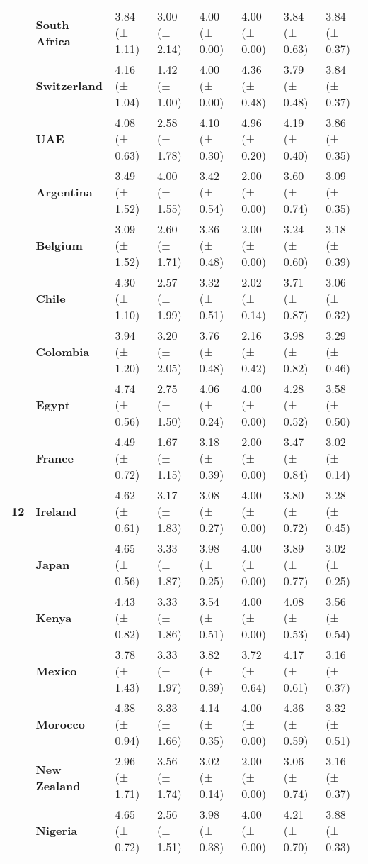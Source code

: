 \begin{tabular}{llllllll}
\textbf{} & \textbf{South Africa} & 3.84 (± 1.11) & 3.00 (± 2.14) & 4.00 (± 0.00) & 4.00 (± 0.00) & 3.84 (± 0.63) & 3.84 (± 0.37) \\
\textbf{} & \textbf{Switzerland} & 4.16 (± 1.04) & 1.42 (± 1.00) & 4.00 (± 0.00) & 4.36 (± 0.48) & 3.79 (± 0.48) & 3.84 (± 0.37) \\
\textbf{} & \textbf{UAE} & 4.08 (± 0.63) & 2.58 (± 1.78) & 4.10 (± 0.30) & 4.96 (± 0.20) & 4.19 (± 0.40) & 3.86 (± 0.35) \\
\cline{1-8}
\multirow[t]{19}{*}{\textbf{12}} & \textbf{Argentina} & 3.49 (± 1.52) & 4.00 (± 1.55) & 3.42 (± 0.54) & 2.00 (± 0.00) & 3.60 (± 0.74) & 3.09 (± 0.35) \\
\textbf{} & \textbf{Belgium} & 3.09 (± 1.52) & 2.60 (± 1.71) & 3.36 (± 0.48) & 2.00 (± 0.00) & 3.24 (± 0.60) & 3.18 (± 0.39) \\
\textbf{} & \textbf{Chile} & 4.30 (± 1.10) & 2.57 (± 1.99) & 3.32 (± 0.51) & 2.02 (± 0.14) & 3.71 (± 0.87) & 3.06 (± 0.32) \\
\textbf{} & \textbf{Colombia} & 3.94 (± 1.20) & 3.20 (± 2.05) & 3.76 (± 0.48) & 2.16 (± 0.42) & 3.98 (± 0.82) & 3.29 (± 0.46) \\
\textbf{} & \textbf{Egypt} & 4.74 (± 0.56) & 2.75 (± 1.50) & 4.06 (± 0.24) & 4.00 (± 0.00) & 4.28 (± 0.52) & 3.58 (± 0.50) \\
\textbf{} & \textbf{France} & 4.49 (± 0.72) & 1.67 (± 1.15) & 3.18 (± 0.39) & 2.00 (± 0.00) & 3.47 (± 0.84) & 3.02 (± 0.14) \\
\textbf{} & \textbf{Ireland} & 4.62 (± 0.61) & 3.17 (± 1.83) & 3.08 (± 0.27) & 4.00 (± 0.00) & 3.80 (± 0.72) & 3.28 (± 0.45) \\
\textbf{} & \textbf{Japan} & 4.65 (± 0.56) & 3.33 (± 1.87) & 3.98 (± 0.25) & 4.00 (± 0.00) & 3.89 (± 0.77) & 3.02 (± 0.25) \\
\textbf{} & \textbf{Kenya} & 4.43 (± 0.82) & 3.33 (± 1.86) & 3.54 (± 0.51) & 4.00 (± 0.00) & 4.08 (± 0.53) & 3.56 (± 0.54) \\
\textbf{} & \textbf{Mexico} & 3.78 (± 1.43) & 3.33 (± 1.97) & 3.82 (± 0.39) & 3.72 (± 0.64) & 4.17 (± 0.61) & 3.16 (± 0.37) \\
\textbf{} & \textbf{Morocco} & 4.38 (± 0.94) & 3.33 (± 1.66) & 4.14 (± 0.35) & 4.00 (± 0.00) & 4.36 (± 0.59) & 3.32 (± 0.51) \\
\textbf{} & \textbf{New Zealand} & 2.96 (± 1.71) & 3.56 (± 1.74) & 3.02 (± 0.14) & 2.00 (± 0.00) & 3.06 (± 0.74) & 3.16 (± 0.37) \\
\textbf{} & \textbf{Nigeria} & 4.65 (± 0.72) & 2.56 (± 1.51) & 3.98 (± 0.38) & 4.00 (± 0.00) & 4.21 (± 0.70) & 3.88 (± 0.33) \\

\end{tabular}
